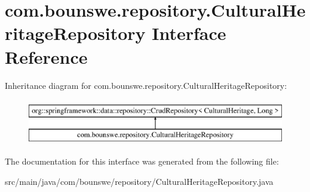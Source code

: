 \hypertarget{interfacecom_1_1bounswe_1_1repository_1_1_cultural_heritage_repository}{}\section{com.\+bounswe.\+repository.\+Cultural\+Heritage\+Repository Interface Reference}
\label{interfacecom_1_1bounswe_1_1repository_1_1_cultural_heritage_repository}
Inheritance diagram for com.\+bounswe.\+repository.\+Cultural\+Heritage\+Repository\+:\begin{figure}[H]
\begin{center}
\leavevmode
\includegraphics[height=2.000000cm]{interfacecom_1_1bounswe_1_1repository_1_1_cultural_heritage_repository}
\end{center}
\end{figure}


The documentation for this interface was generated from the following file\+:\begin{DoxyCompactItemize}
\item 
src/main/java/com/bounswe/repository/Cultural\+Heritage\+Repository.\+java\end{DoxyCompactItemize}
